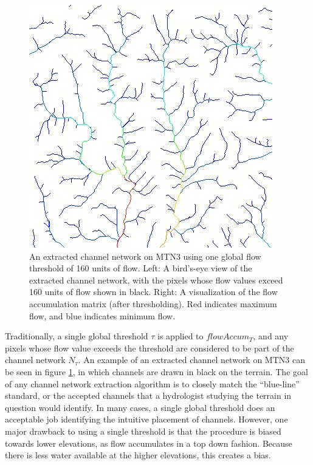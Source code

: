 \begin{figure}[t]
\begin{minipage}[b]{0.45\linewidth}
\begin{center}
\includegraphics[width=\linewidth]{images/FlowField_mtn3_WithoutWeight.jpg}
\end{center}
\end{minipage}
\caption[An extracted channel network on MTN3 with a global threshold.]{\label{figure:ChannelNetwork_GlobalThreshold} An extracted channel network on MTN3 using one global flow threshold of 160 units of flow. Left: A bird's-eye view of the extracted channel network, with the pixels whose flow values exceed 160 units of flow shown in black. Right: A visualization of the flow accumulation matrix (after thresholding). Red indicates maximum flow, and blue indicates minimum flow. }
\end{figure}



Traditionally, a single global threshold $\tau$ is applied to $flowAccum_{T}$,
and any pixels whose flow value exceeds the threshold are considered to be part of the channel network $N_{\tau}$. An example of an extracted channel network on MTN3 can be seen in figure \ref{figure:ChannelNetwork_GlobalThreshold}, in which channels are drawn in black on the terrain. The goal of any channel network extraction algorithm is to closely match the ``blue-line'' standard, or the accepted channels that a hydrologist studying the terrain in question would identify. In many cases, a single global threshold does an acceptable job identifying the intuitive placement of channels. However, one major drawback to using a single threshold is that the procedure is biased towards lower elevations, as flow accumulates in a top down fashion. Because there is less water available at the higher elevations, this creates a bias.

